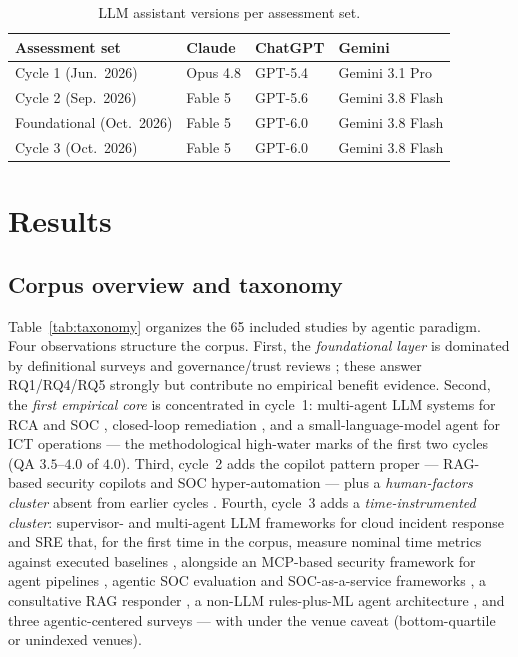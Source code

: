 \documentclass{ieeeaccess}
\begin{document}
\begin{table}[!t]
\caption{LLM assistant versions per assessment set.}
\label{tab:llmversions}
\centering
\footnotesize
\begin{tabular}{@{}llll@{}}
\toprule
\textbf{Assessment set} & \textbf{Claude} & \textbf{ChatGPT} & \textbf{Gemini} \\
\midrule
Cycle 1 (Jun.\ 2026) & Opus 4.8 & GPT-5.4 & Gemini 3.1 Pro \\
Cycle 2 (Sep.\ 2026) & Fable 5 & GPT-5.6 & Gemini 3.8 Flash \\
Foundational (Oct.\ 2026) & Fable 5 & GPT-6.0 & Gemini 3.8 Flash \\
Cycle 3 (Oct.\ 2026) & Fable 5 & GPT-6.0 & Gemini 3.8 Flash \\
\bottomrule
\end{tabular}
\end{table}

\section{Results}
\label{sec:results}

\subsection{Corpus overview and taxonomy}
\label{sec:taxonomy}

Table~\ref{tab:taxonomy} organizes the 65 included studies by agentic
paradigm. Four observations structure the corpus. First, the
\emph{foundational layer} is dominated by definitional surveys
\cite{P09,P10,P15,P54} and governance/trust reviews \cite{P01,P17};
these answer RQ1/RQ4/RQ5 strongly but contribute no empirical benefit
evidence. Second, the \emph{first empirical core} is concentrated in
cycle~1: multi-agent LLM systems for RCA and SOC \cite{P27,P28,P31,P35},
closed-loop remediation \cite{P22}, and a small-language-model agent for
ICT operations \cite{P21} --- the methodological high-water marks of the
first two cycles (QA $3.5$--$4.0$ of $4.0$). Third, cycle~2 adds the
copilot pattern proper --- RAG-based security copilots
\cite{P78,P83,P87} and SOC hyper-automation \cite{P76} --- plus a
\emph{human-factors cluster} absent from earlier cycles
\cite{P62,P63,P69,P81}. Fourth, cycle~3 adds a \emph{time-instrumented
cluster}: supervisor- and multi-agent LLM frameworks for cloud incident
response and SRE that, for the first time in the corpus, measure nominal
time metrics against executed baselines \cite{P100,P101,P102,P123},
alongside an MCP-based security framework for agent pipelines
\cite{P94}, agentic SOC evaluation and SOC-as-a-service frameworks
\cite{P93,P97}, a consultative RAG responder \cite{P119}, a non-LLM
rules-plus-ML agent architecture \cite{P91}, and three agentic-centered
surveys \cite{P110,P112,P121} --- with \cite{P91,P101,P102} under the
venue caveat (bottom-quartile or unindexed venues).
\end{document}
